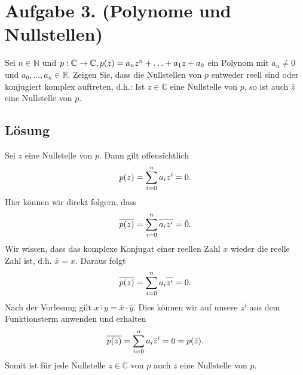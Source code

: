 \documentclass[german,12pt]{homework}
\newcommand{\NN}{\mathbb{N}}
\newcommand{\RR}{\mathbb{R}}
\newcommand{\CC}{\mathbb{C}}
\DeclarePairedDelimiter{\enbrace}{(}{)}
\begin{document}
\begin{enumerate}
\begin{center}
        \end{center}
    \end{enumerate}

    \section*{Aufgabe 3. (Polynome und Nullstellen)}

    \begin{problem}
        Sei \(n \in \NN\) und \(p: \CC \to \CC, p\enbrace*{z} = a_nz^n + \ldots + a_1z + a_0\) ein Polynom mit \(a_n \ne 0\) und \(a_0, \ldots, a_n \in \RR\). Zeigen Sie, dass die Nullstellen von \(p\) entweder reell sind oder konjugiert komplex auftreten, d.h.: Ist \(z \in \CC\) eine Nullstelle von \(p\), so ist auch \(\bar{z}\) eine Nullstelle von \(p\).
    \end{problem}

    \subsection*{Lösung} Sei \(z\) eine Nullstelle von \(p\). Dann gilt offensichtlich
    \[p\enbrace*{z} = \sum_{i = 0}^na_iz^i = 0.\]
    Hier können wir direkt folgern, dass
    \[\overline{p\enbrace*{z}} = \sum_{i = 0}^n\overline{a_iz^i} = \bar{0}.\]
    Wir wissen, dass das komplexe Konjugat einer reellen Zahl \(x\) wieder die reelle Zahl ist, d.h. \(\bar{x} = x\). Daraus folgt
    \[\overline{p\enbrace*{z}} = \sum_{i = 0}^na_i\overline{z^i} = 0.\]
    Nach der Vorlesung gilt \(\overline{x \cdot y} = \bar{x} \cdot \bar{y}\). Dies können wir auf unsere \(z^i\) aus dem Funktionsterm anwenden und erhalten
    \[\overline{p\enbrace*{z}} = \sum_{i = 0}^na_i\bar{z}^i = 0 = p\enbrace*{\bar{z}}.\]
    Somit ist für jede Nullstelle \(z \in \CC\) von \(p\) auch \(\bar{z}\) eine Nullstelle von \(p\).
\end{document}
